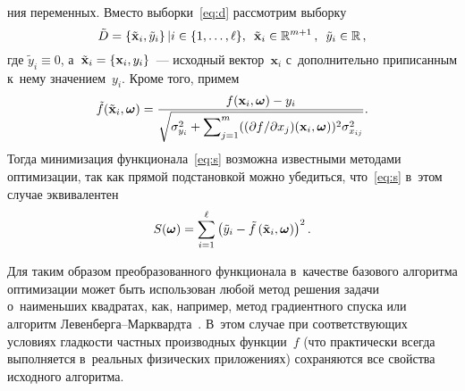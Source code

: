 \begin{multicols}{2}
\pagebreak

\noindent
ния 
переменных. Вместо выборки~\eqref{eq:d}
рас\-смот\-рим выборку 
$$
  \tilde{D} = \left\{ \tilde{\mathbf{x}}_i, \tilde{y}_i \right\} | i \in 
  \{ 1, \dots, \ell 
\},\enskip
 \tilde{\mathbf{x}}_i \in \mathbb{R}^{m + 1}\,,\enskip
  \tilde{y}_i \in \mathbb{R}\,,
$$
где $\tilde{y}_i \equiv 0$, а~$\tilde{\mathbf{x}}_i \hm= \{ \mathbf{x}_i, y_i \}$~--- 
исходный вектор~$\mathbf{x}_i$
с~дополнительно приписанным к~нему значением~$y_i$. Кроме того, примем
$$
  \tilde{f}(\tilde{\mathbf{x}}_i, \boldsymbol{\omega}) = \displaystyle\frac{\displaystyle f(\mathbf{x}_i, \boldsymbol{\omega}) - 
y_i\mathstrut}{\displaystyle \sqrt{\sigma_{y_i}^2 + \sum\nolimits_{j = 1}^m (({\partial f}/{\partial 
x_j})(\mathbf{x}_i, \boldsymbol{\omega}))^2 \sigma^2_{x_{ij}}}\mathstrut}.
$$
Тогда минимизация функционала~\eqref{eq:s} возможна известными методами 
оптимизации, так как прямой подстановкой можно убедиться, что~\eqref{eq:s} 
в~этом случае эквивалентен
$$
  S(\boldsymbol{\omega}) = \sum\limits_{i = 1}^\ell \left(
  \tilde{y}_i - \tilde{f}\left(\tilde{\mathbf{x}}_i,  \boldsymbol{\omega}\right)\right)^2.
$$

\begin{comment}
Легко показать, что градиент~$\tilde{f}$ по па\-ра\-мет\-рам выглядит следующим 
образом:
\begin{footnotesize}
\[
  \frac{\partial\tilde{f}}{\partial \omega_k}(\mathbf{x}_i, \bomega) = \frac{
        \frac{\partial f}{\partial \omega_k}(\mathbf{x}_i, \bomega) 
\Big(\sigma_{y_i}^2 + \sum_{j = 1}^m \big(\frac{\partial f}{\partial x_j} 
(\mathbf{x}_i, \bomega)\big)^2 \sigma_{x_{ij}}^2 \Big)-
        \big(f(\mathbf{x}_i, \bomega) - y_i\big) \sum_{j = 1}^m 
\sigma_{x_{ij}}^2 \frac{\partial f}{\partial x_j}(\mathbf{x}_i, \bomega) 
\frac{\partial^2 f}{\partial x_j \partial \omega_k}(\mathbf{x}_i, \bomega)}
  {\Big( \sigma_{y_i}^2 + \sum_{j = 1}^m \big(\frac{\partial f}{\partial x_j} 
(\mathbf{x}_i, \bomega)\big)^2 \sigma_{x_{ij}}^2 \Big)^{\sfrac{3}{2}}}.
\]
\end{footnotesize}
\end{comment}

Для таким образом преобразованного функционала
в~качестве базового алгоритма оптимизации может
быть использован любой метод решения зада\-чи о~наименьших квад\-ра\-тах, как, 
например,
метод градиентного спуска или алгоритм Ле\-вен\-бер\-га--Марк\-вард\-та~\cite{dlib09}.
В~этом случае при
соответствующих условиях глад\-кости частных производных функции~$f$ (что 
практически всегда выполняется в~реальных физических приложениях) 
сохраняются все свойства
исходного алгоритма.


\end{multicols}
